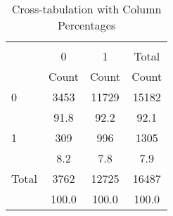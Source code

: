\begin{table}[htbp]\centering
\def\sym#1{\ifmmode^{#1}\else\(^{#1}\)\fi}
\caption{Cross-tabulation with Column Percentages}
\begin{tabular}{l*{3}{c}}
\hline\hline
            &\multicolumn{3}{c}{}                  \\
            &           0&           1&       Total\\
            &       Count&       Count&       Count\\
\hline
0           &        3453&       11729&       15182\\
            &        91.8&        92.2&        92.1\\
1           &         309&         996&        1305\\
            &         8.2&         7.8&         7.9\\
Total       &        3762&       12725&       16487\\
            &       100.0&       100.0&       100.0\\
\hline\hline
\end{tabular}
\end{table}
